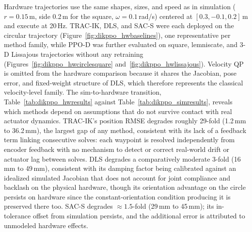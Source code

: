 Hardware trajectories use the same shapes, sizes, and speed as in simulation ($r = 0.15$\,m, side
0.2\,m for the square, $\omega = 0.1$\,rad/s) centered at $[0.3, -0.1, 0.2]$\,m and execute at 20\,Hz.
TRAC-IK, DLS, and SAC-S were each deployed on the circular trajectory
(Figure~\ref{fig:dikppo_hwbaselines}), one representative per method family, while PPO-D was further
evaluated on square, lemniscate, and 3-D Lissajous trajectories without any retraining
(Figures~\ref{fig:dikppo_hwcirclesquare} and~\ref{fig:dikppo_hwlissajous}). Velocity QP is omitted
from the hardware comparison because it shares the Jacobian, pose error, and fixed-weight structure
of DLS, which therefore represents the classical velocity-level family. The sim-to-hardware
transition, Table~\ref{tab:dikppo_hwresults} against Table~\ref{tab:dikppo_simresults}, reveals which
methods depend on assumptions that do not survive contact with real actuator dynamics. TRAC-IK's
position RMSE degrades roughly 29-fold (1.2\,mm to 36.2\,mm), the largest gap of any method,
consistent with its lack of a feedback term linking consecutive solves: each waypoint is resolved
independently from encoder feedback with no mechanism to detect or correct real-world drift or
actuator lag between solves. DLS degrades a comparatively moderate 3-fold (16\,mm to 49\,mm),
consistent with its damping factor being calibrated against an idealized simulated Jacobian that
does not account for joint compliance and backlash on the physical hardware, though its orientation
advantage on the circle persists on hardware since the constant-orientation condition producing it
is preserved there too. SAC-S degrades $\approx 1.5$-fold (29\,mm to 45\,mm); its in-tolerance offset
from simulation persists, and the additional error is attributed to unmodeled hardware effects.

